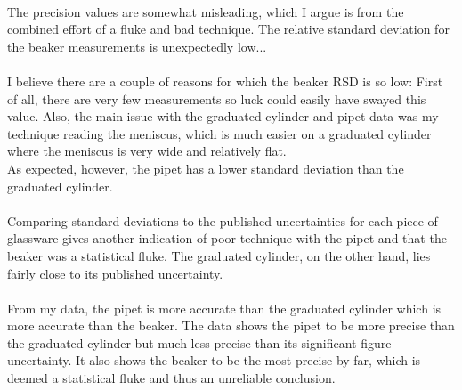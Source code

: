 \documentclass[fleqn,titlepage]{article}
\begin{document}
    \paragraph{} The precision values are somewhat misleading, which I argue is from the combined effort of a fluke and bad technique. The relative standard deviation for the beaker measurements is unexpectedly low... \\
     \\[0.2cm]
    I believe there are a couple of reasons for which the beaker RSD is so low: First of all, there are very few measurements so luck could easily have swayed this value. Also, the main issue with the graduated cylinder and pipet data was my technique reading the meniscus, which is much easier on a graduated cylinder where the meniscus is very wide and relatively flat. \\
    As expected, however, the pipet has a lower standard deviation than the graduated cylinder.

    \paragraph{} Comparing standard deviations to the published uncertainties for each piece of glassware gives another indication of poor technique with the pipet and that the beaker was a statistical fluke. The graduated cylinder, on the other hand, lies fairly close to its published uncertainty. \\

    \paragraph{} From my data, the pipet is more accurate than the graduated cylinder which is more accurate than the beaker. The data shows the pipet to be more precise than the graduated cylinder but much less precise than its significant figure uncertainty. It also shows the beaker to be the most precise by far, which is deemed a statistical fluke and thus an unreliable conclusion.
\end{document}
